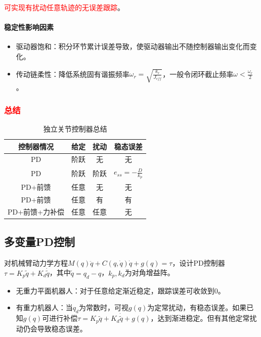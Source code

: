 \documentclass[
12pt, %
a4paper, 
oneside, %
]{scrartcl}
\begin{document}
\textcolor{red}{可实现有扰动任意轨迹的无误差跟踪}。
\paragraph{稳定性影响因素}
\begin{itemize}
\item 驱动器饱和：积分环节累计误差导致，使驱动器输出不随控制器输出变化而变化。
\item 传动链柔性：降低系统固有谐振频率$ \omega_r = \sqrt{\frac{k_r}{J_{eff}}} $，一般令闭环截止频率$ \omega < \frac{\omega_r}{2} $。
\end{itemize}
\subsubsection[总结]{\textcolor{red}{总结}}
\begin{table}[H]
\centering
\begin{tabular}{c|c|c|c}
\hline
控制器情况 & 给定 & 扰动 & 稳态误差 \\
\hline
PD & 阶跃 & 无 & 无 \\
PD & 阶跃 & 阶跃 & $ e_{ss} = -\frac{D}{k_p} $ \\
PD+前馈 & 任意 & 无 & 无 \\
PD+前馈 & 任意 & 有 & 有 \\
PD+前馈+力补偿 & 任意 & 任意 & 无 \\
\hline
\end{tabular}
\caption{独立关节控制器总结}
\end{table}
\subsection[多变量PD控制]{多变量PD控制}
对机械臂动力学方程$ M(q) \ddot{q} + C(q, \dot{q})\dot{q} + g(q) = \tau $，设计PD控制器$ \tau = K_p \tilde{q} + K_d \dot{\tilde{q}} $，其中$ \tilde{q} = q_d - q $，$ k_p, k_d $为对角增益阵。
\begin{itemize}
\item 无重力平面机器人：对于任意给定渐近稳定，跟踪误差可收敛到$ 0 $。
\item 有重力机器人：当$ q_d $为常数时，可视$ g(q) $为定常扰动，有稳态误差。如果已知$ g(q) $可进行补偿$ \tau = K_p \tilde{q} + K_d \dot{\tilde{q}} + g(q) $，达到渐进稳定。但有其他定常扰动仍会导致稳态误差。
\end{itemize}
\end{document}
